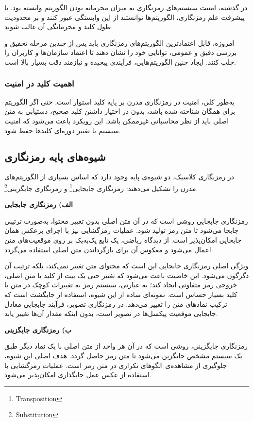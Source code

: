 \documentclass[a4paper,12pt]{report}
\renewcommand{\%}{\lr{\oldpercent}}
\providecommand{\LTRfootnote}[1]{\footnote{#1}}
\begin{document}
در گذشته، امنیت سیستم‌های رمزنگاری به میزان محرمانه بودن الگوریتم وابسته بود. با پیشرفت علم رمزنگاری، الگوریتم‌ها توانستند از این وابستگی عبور کنند و بر محدودیت طول کلید و محرمانگی آن غالب شوند. 

امروزه، قابل اعتمادترین الگوریتم‌های رمزنگاری باید پس از چندین مرحله تحقیق و بررسی دقیق و عمومی، توانایی خود را نشان دهند تا اعتماد سازمان‌ها و کاربران را جلب کنند. ایجاد چنین الگوریتم‌هایی، فرآیندی پیچیده و نیازمند دقت بسیار بالا است\cite{ref21}.

\subsubsection{اهمیت کلید در امنیت}
به‌طور کلی، امنیت در رمزنگاری مدرن بر پایه کلید استوار است. حتی اگر الگوریتم برای همگان شناخته شده باشد، بدون در اختیار داشتن کلید صحیح، دستیابی به متن اصلی باید از نظر محاسباتی غیرممکن باشد. این رویکرد باعث می‌شود که امنیت سیستم با تغییر دوره‌ای کلیدها حفظ شود.

\subsection{شیوه‌های پایه رمزنگاری}
در رمزنگاری کلاسیک، دو شیوه‌ی پایه وجود دارد که اساس بسیاری از الگوریتم‌های مدرن را تشکیل می‌دهند: رمزنگاری جابجایی\LTRfootnote{Transposition} و رمزنگاری جایگزینی\LTRfootnote{Substitution}\cite{ref22}.

\textbf{الف) رمزنگاری جابجایی}

رمزنگاری جابجایی روشی است که در آن متن اصلی بدون تغییر محتوا، به‌صورت ترتیبی جابجا می‌شود تا متن رمز تولید شود. عملیات رمزگشایی نیز با اجرای برعکس همان جابجایی امکان‌پذیر است. از دیدگاه ریاضی، یک تابع یک‌به‌یک بر روی موقعیت‌های متن اعمال می‌شود و معکوس آن برای بازگرداندن متن اصلی استفاده می‌گردد.

ویژگی اصلی رمزنگاری جابجایی این است که محتوای متن تغییر نمی‌کند، بلکه ترتیب آن دگرگون می‌شود. این خاصیت باعث می‌شود که تغییر حتی یک بیت از کلید یا متن اصلی، خروجی رمز متفاوتی ایجاد کند؛ به عبارتی، سیستم رمز به تغییرات کوچک در متن یا کلید بسیار حساس است. نمونه‌ای ساده از این شیوه، استفاده از جایگشت است که ترکیب نمادهای متن را تغییر می‌دهد. در رمزنگاری تصویر، فرآیند جابجایی معادل جابجایی موقعیت پیکسل‌ها در تصویر است، بدون اینکه مقدار آن‌ها تغییر یابد\cite{ref23}.

\textbf{ب) رمزنگاری جایگزینی}

رمزنگاری جایگزینی، روشی است که در آن هر واحد از متن اصلی با یک نماد دیگر طبق یک سیستم مشخص جایگزین می‌شود تا متن رمز حاصل گردد. هدف اصلی این شیوه، جلوگیری از مشاهده‌ی الگوهای تکراری در متن رمز است. عملیات رمزگشایی با استفاده از عکس عمل جایگذاری امکان‌پذیر می‌شود.
\end{document}
